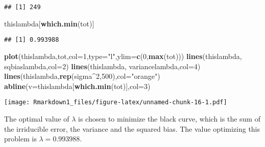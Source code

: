 \documentclass[]{article}
\newenvironment{Shaded}{\begin{snugshade}}{\end{snugshade}}
\newcommand{\KeywordTok}[1]{\textcolor[rgb]{0.13,0.29,0.53}{\textbf{#1}}}
\newcommand{\DataTypeTok}[1]{\textcolor[rgb]{0.13,0.29,0.53}{#1}}
\newcommand{\DecValTok}[1]{\textcolor[rgb]{0.00,0.00,0.81}{#1}}
\newcommand{\StringTok}[1]{\textcolor[rgb]{0.31,0.60,0.02}{#1}}
\newcommand{\OperatorTok}[1]{\textcolor[rgb]{0.81,0.36,0.00}{\textbf{#1}}}
\newcommand{\NormalTok}[1]{#1}
\begin{document}
\begin{verbatim}
## [1] 249
\end{verbatim}

\begin{Shaded}
\begin{Highlighting}[]
\NormalTok{thislambda[}\KeywordTok{which.min}\NormalTok{(tot)]}
\end{Highlighting}
\end{Shaded}

\begin{verbatim}
## [1] 0.993988
\end{verbatim}

\begin{Shaded}
\begin{Highlighting}[]
\KeywordTok{plot}\NormalTok{(thislambda,tot,}\DataTypeTok{col=}\DecValTok{1}\NormalTok{,}\DataTypeTok{type=}\StringTok{"l"}\NormalTok{,}\DataTypeTok{ylim=}\KeywordTok{c}\NormalTok{(}\DecValTok{0}\NormalTok{,}\KeywordTok{max}\NormalTok{(tot)))}
\KeywordTok{lines}\NormalTok{(thislambda, sqbiaslambda,}\DataTypeTok{col=}\DecValTok{2}\NormalTok{)}
\KeywordTok{lines}\NormalTok{(thislambda, variancelambda,}\DataTypeTok{col=}\DecValTok{4}\NormalTok{)}
\KeywordTok{lines}\NormalTok{(thislambda,}\KeywordTok{rep}\NormalTok{(sigma}\OperatorTok{^}\DecValTok{2}\NormalTok{,}\DecValTok{500}\NormalTok{),}\DataTypeTok{col=}\StringTok{"orange"}\NormalTok{)}
\KeywordTok{abline}\NormalTok{(}\DataTypeTok{v=}\NormalTok{thislambda[}\KeywordTok{which.min}\NormalTok{(tot)],}\DataTypeTok{col=}\DecValTok{3}\NormalTok{)}
\end{Highlighting}
\end{Shaded}

\texttt{[image: Rmarkdown1\_files/figure-latex/unnamed-chunk-16-1.pdf]}

The optimal value of \(\lambda\) is chosen to minimize the black curve,
which is the sum of the irriducible error, the variance and the squared
bias. The value optimizing this problem is \(\lambda = 0.993988\).
\end{document}
